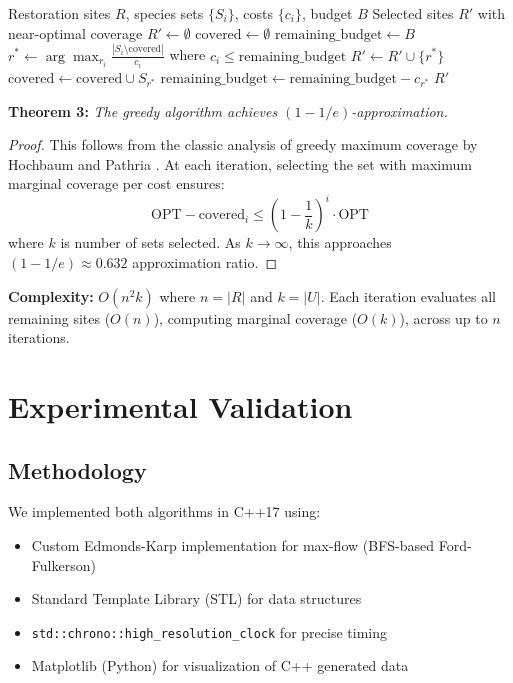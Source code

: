 \documentclass[sigconf,nonacm]{acmart}
\begin{document}
\begin{algorithm}[H]
\caption{Greedy Maximum Coverage}
\begin{algorithmic}[1]
\Require Restoration sites $R$, species sets $\{S_i\}$, costs $\{c_i\}$, budget $B$
\Ensure Selected sites $R'$ with near-optimal coverage
\State $R' \gets \emptyset$
\State $\text{covered} \gets \emptyset$
\State $\text{remaining\_budget} \gets B$
    \State $r^* \gets \arg\max_{r_i} \frac{|S_i \setminus \text{covered}|}{c_i}$ where $c_i \leq \text{remaining\_budget}$
    \State $R' \gets R' \cup \{r^*\}$
    \State $\text{covered} \gets \text{covered} \cup S_{r^*}$
    \State $\text{remaining\_budget} \gets \text{remaining\_budget} - c_{r^*}$
\EndWhile
\State \Return $R'$
\end{algorithmic}
\end{algorithm}

\textbf{Theorem 3:} \textit{The greedy algorithm achieves $(1 - 1/e)$-approximation.}

\begin{proof}
This follows from the classic analysis of greedy maximum coverage by Hochbaum and Pathria \cite{hochbaum1998analysis}. At each iteration, selecting the set with maximum marginal coverage per cost ensures:
\[
    \text{OPT} - \text{covered}_i \leq \left(1 - \frac{1}{k}\right)^i \cdot \text{OPT}
\]
where $k$ is number of sets selected. As $k \to \infty$, this approaches $(1 - 1/e) \approx 0.632$ approximation ratio.
\end{proof}

\textbf{Complexity:} $O(n^2 k)$ where $n = |R|$ and $k = |U|$. Each iteration evaluates all remaining sites ($O(n)$), computing marginal coverage ($O(k)$), across up to $n$ iterations.

\section{Experimental Validation}

\subsection{Methodology}

We implemented both algorithms in C++17 using:
\begin{itemize}
    \item Custom Edmonds-Karp implementation for max-flow (BFS-based Ford-Fulkerson)
    \item Standard Template Library (STL) for data structures
    \item \texttt{std::chrono::high\_resolution\_clock} for precise timing
    \item Matplotlib (Python) for visualization of C++ generated data
\end{itemize}
\end{document}
